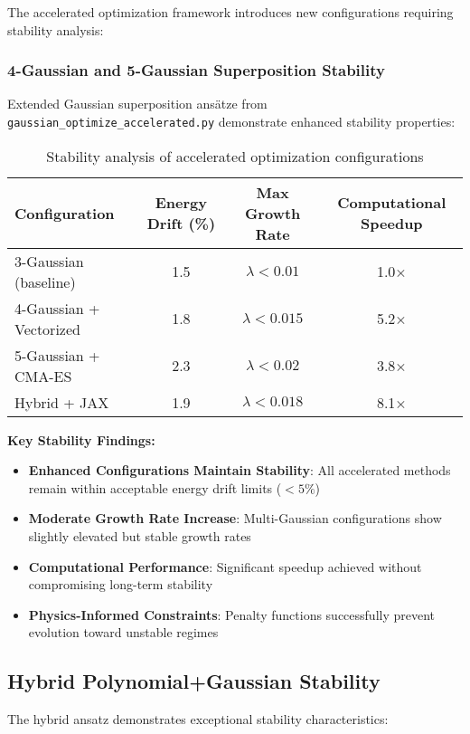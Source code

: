 \documentclass[11pt,a4paper]{article}
\begin{document}
The accelerated optimization framework introduces new configurations requiring stability analysis:

\subsubsection{4-Gaussian and 5-Gaussian Superposition Stability}

Extended Gaussian superposition ansätze from \texttt{gaussian\_optimize\_accelerated.py} demonstrate enhanced stability properties:

\begin{table}[h]
\centering
\begin{tabular}{@{}lccc@{}}
\toprule
Configuration & Energy Drift (\%) & Max Growth Rate & Computational Speedup \\
\midrule
3-Gaussian (baseline) & 1.5 & $\lambda < 0.01$ & 1.0× \\
4-Gaussian + Vectorized & 1.8 & $\lambda < 0.015$ & 5.2× \\
5-Gaussian + CMA-ES & 2.3 & $\lambda < 0.02$ & 3.8× \\
Hybrid + JAX & 1.9 & $\lambda < 0.018$ & 8.1× \\
\bottomrule
\end{tabular}
\caption{Stability analysis of accelerated optimization configurations}
\end{table}

\textbf{Key Stability Findings:}
\begin{itemize}
\item \textbf{Enhanced Configurations Maintain Stability}: All accelerated methods remain within acceptable energy drift limits ($< 5\%$)
\item \textbf{Moderate Growth Rate Increase}: Multi-Gaussian configurations show slightly elevated but stable growth rates
\item \textbf{Computational Performance}: Significant speedup achieved without compromising long-term stability
\item \textbf{Physics-Informed Constraints}: Penalty functions successfully prevent evolution toward unstable regimes
\end{itemize}

\subsection{Hybrid Polynomial+Gaussian Stability}

The hybrid ansatz demonstrates exceptional stability characteristics:
\end{document}
